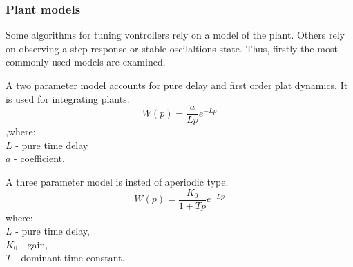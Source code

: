 \subsubsection{Plant models}
Some algorithms for tuning vontrollers rely on a model of the plant.
Others rely on observing a step response or stable oscilaltions state.
Thus, firstly the most commonly used models are examined.
\par
A two parameter model accounts for pure delay and first order plat dynamics.
It is used for integrating plants.
\begin{equation}
    W(p) = \frac{a}{L p} e^{- L p}
\end{equation}
,where:  \\
$L$ - pure time delay \\
$a$ - coefficient.
\par
A three parameter model is insted of aperiodic type.
\begin{equation}
    W(p) = \frac{K_0}{1 + T p} e^{-Lp}
\end{equation}
where:  \\
$L$ - pure time delay,  \\
$K_0$ - gain,  \\
$T$ - dominant time constant.

